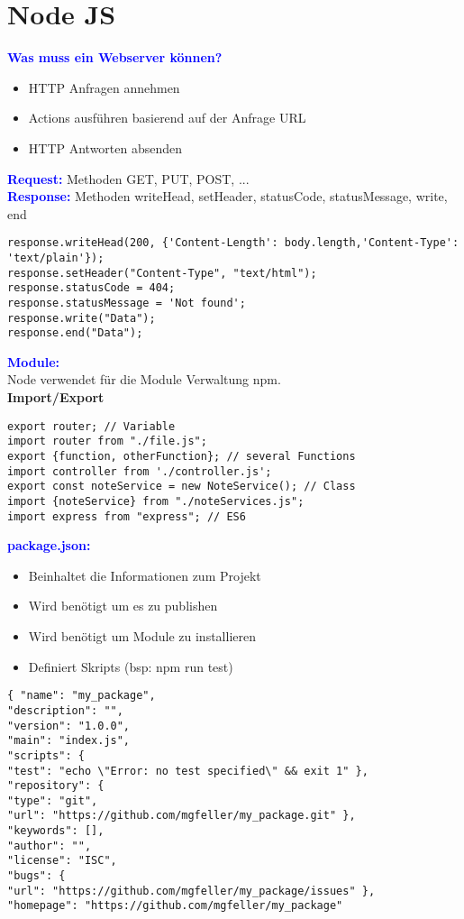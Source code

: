 \section{Node JS}
\textbf{\textcolor{blue}{Was muss ein Webserver können?}}
\begin{itemize}[topsep=0pt, leftmargin=3mm]
    \setlength\itemsep{-0.3em}
    \item HTTP Anfragen annehmen
    \item Actions ausführen basierend auf der Anfrage URL
    \item HTTP Antworten absenden
\end{itemize}
\textbf{\textcolor{blue}{Request:}} Methoden GET, PUT, POST, ...\\
\textbf{\textcolor{blue}{Response:}} Methoden writeHead, setHeader, statusCode, statusMessage, write, end
\begin{lstlisting}[style=htmlcssjs]
response.writeHead(200, {'Content-Length': body.length,'Content-Type': 'text/plain'});
response.setHeader("Content-Type", "text/html");
response.statusCode = 404;
response.statusMessage = 'Not found';
response.write("Data");
response.end("Data");
\end{lstlisting}
\textbf{\textcolor{blue}{Module:}}\\
Node verwendet für die Module Verwaltung npm.\\
\textbf{Import/Export}
\begin{lstlisting}[style=htmlcssjs]
export router; // Variable
import router from "./file.js";
export {function, otherFunction}; // several Functions
import controller from './controller.js';
export const noteService = new NoteService(); // Class
import {noteService} from "./noteServices.js";
import express from "express"; // ES6
\end{lstlisting}
\textbf{\textcolor{blue}{package.json:}}
\begin{itemize}[topsep=0pt, leftmargin=3mm]
    \setlength\itemsep{-0.3em}
    \item Beinhaltet die Informationen zum Projekt
    \item Wird benötigt um es zu publishen
    \item Wird benötigt um Module zu installieren
    \item Definiert Skripts (bsp: npm run test)
\end{itemize}
\begin{lstlisting}[style=htmlcssjs]
{ "name": "my_package",
"description": "",
"version": "1.0.0",
"main": "index.js",
"scripts": {
"test": "echo \"Error: no test specified\" && exit 1" },
"repository": {
"type": "git",
"url": "https://github.com/mgfeller/my_package.git" },
"keywords": [],
"author": "",
"license": "ISC",
"bugs": {
"url": "https://github.com/mgfeller/my_package/issues" },
"homepage": "https://github.com/mgfeller/my_package"
\end{lstlisting}
